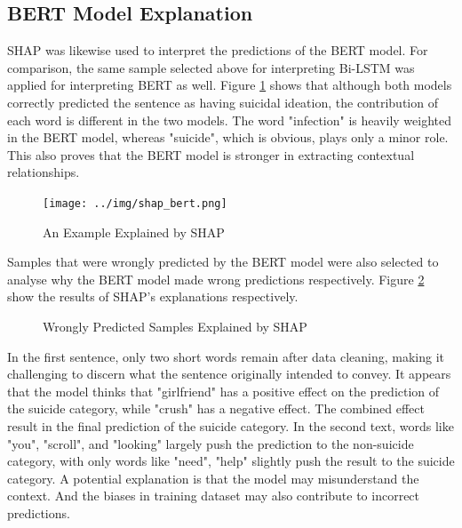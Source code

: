 \documentclass[ %
                    author={Bocheng Wang},
                supervisor={Dr. Qiang Liu},
                    degree={MSc},
                     title={A Research on Identification of Suicide Ideation in Texts with Multiple Models},
                      type={},
                      year={2024}]{dissertation}
\begin{document}
\subsection{BERT Model Explanation}
\noindent
SHAP was likewise used to interpret the predictions of the BERT model. For comparison, the same sample selected above for interpreting Bi-LSTM was applied for interpreting BERT as well. Figure \ref{shap_bert} shows that although both models correctly predicted the sentence as having suicidal ideation, the contribution of each word is different in the two models. The word "infection" is heavily weighted in the BERT model, whereas "suicide", which is obvious, plays only a minor role. This also proves that the BERT model is stronger in extracting contextual relationships.

\begin{figure}[h]
      \centering
      \texttt{[image: ../img/shap\_bert.png]}
      \caption{An Example Explained by SHAP}
      \label{shap_bert}
\end{figure}

Samples that were wrongly predicted by the BERT model were also selected to analyse why the BERT model made wrong predictions respectively. Figure \ref{fig:bertshap} show the results of SHAP's explanations respectively.

\begin{figure}[h]
      \centering
      \hfil
      \caption{Wrongly Predicted Samples Explained by SHAP}
      \label{fig:bertshap}
\end{figure}

In the first sentence, only two short words remain after data cleaning, making it challenging to discern what the sentence originally intended to convey. It appears that the model thinks that "girlfriend" has a positive effect on the prediction of the suicide category, while "crush" has a negative effect. The combined effect result in the final prediction of the suicide category. In the second text, words like "you", "scroll", and "looking" largely push the prediction to the non-suicide category, with only words like "need", "help" slightly push the result to the suicide category. A potential explanation is that the model may misunderstand the context. And the biases in training dataset may also contribute to incorrect predictions.
\end{document}

